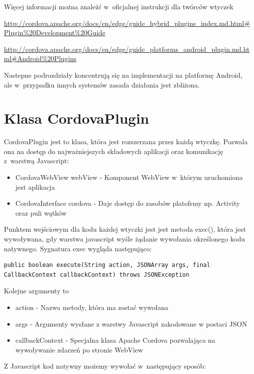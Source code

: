 \documentclass[brudnopis]{xmgr}
\begin{document}
Więcej informacji można znaleźć w~oficjalnej instrukcji dla twórców wtyczek

\url{http://cordova.apache.org/docs/en/edge/guide\_hybrid\_plugins\_index.md.html\#Plugin\%20Development\%20Guide}  

\url{http://cordova.apache.org/docs/en/edge/guide\_platforms\_android\_plugin.md.html\#Android\%20Plugins}   

Nastepne podrozdziały koncentrują się na implementacji na platformę Android, ale w~przypadku innych systemów zasada działania jest zbliżona.

\section{Klasa CordovaPlugin}

CordovaPlugin jest to klasa, która jest rozszerzana przez każdą wtyczkę. Pozwala ona na dostęp do najważniejszych składowych aplikacji oraz komunikację z~warstwą Javascript: 

\begin{itemize}
  \item CordovaWebView webView - Komponent WebView w~którym uruchomiona jest aplikacja
  \item CordovaInterface cordova - Daje dostęp do zasobów platofrmy np. Activity oraz puli wątków
\end{itemize}

Punktem wejściowym dla kodu każdej wtyczki jest jest metoda exec(), która jest wywoływana, gdy warstwa javascript wyśle żądanie wywołania określonego kodu natywnego. Sygnatura exec wygląda następująco:

\begin{lstlisting}
public boolean execute(String action, JSONArray args, final CallbackContext callbackContext) throws JSONException
\end{lstlisting}

Kolejne argumenty to
\begin{itemize}
  \item action - Nazwa metody, która ma zostać wywołana
  \item args - Argumenty wysłane z warstwy Javascript zakodowane w postaci JSON
  \item callbackContext - Specjalna klasa Apache Cordova pozwalająca na wywoływanie zdarzeń po stronie WebView 
\end{itemize}

Z Javascript kod natywny możemy wywołać w~następujący sposób:
\end{document}

